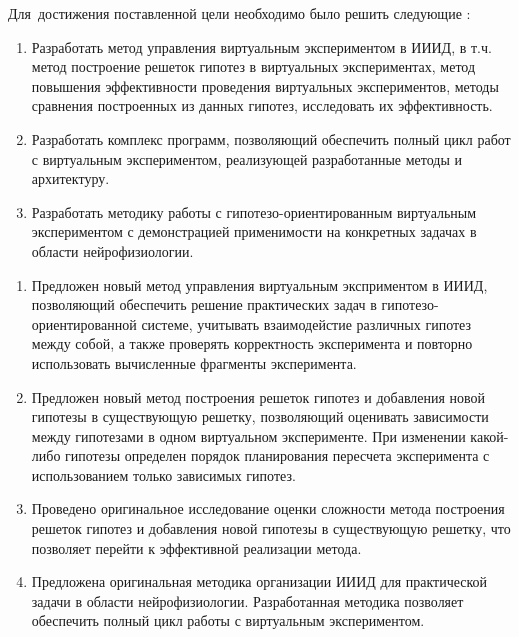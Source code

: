 Для~достижения поставленной цели необходимо было решить следующие {\tasks}:
\begin{enumerate}[beginpenalty=10000] %
    \item Разработать метод управления виртуальным экспериментом в ИИИД, в т.ч. метод построение решеток 
            гипотез в виртуальных экспериментах, метод повышения эффективности проведения виртуальных 
            экспериментов, методы сравнения построенных из данных гипотез, исследовать их эффективность.
    \item Разработать комплекс программ, позволяющий обеспечить полный цикл работ с виртуальным экспериментом, 
            реализующей разработанные методы и архитектуру.
    \item Разработать методику работы с гипотезо-ориентированным виртуальным экспериментом с демонстрацией 
            применимости на конкретных задачах в области нейрофизиологии.
\end{enumerate}


{\novelty}
\begin{enumerate}[beginpenalty=10000] %
  \item Предложен новый метод управления виртуальным эксприментом в ИИИД, позволяющий 
        обеспечить решение практических задач в гипотезо-ориентированной системе, учитывать взаимодейстие различных 
        гипотез между собой, а также проверять корректность эксперимента и повторно использовать вычисленные фрагменты
        эксперимента. 
  \item Предложен новый метод построения решеток гипотез и добавления новой гипотезы в существующую решетку, 
        позволяющий оценивать зависимости между гипотезами в одном виртуальном эксперименте.	
        При изменении какой-либо гипотезы определен порядок планирования пересчета эксперимента с использованием 
        только зависимых гипотез. 
  \item Проведено оригинальное исследование оценки сложности метода построения решеток гипотез и 
        добавления новой гипотезы в существующую решетку, что позволяет перейти к эффективной реализации метода.
  \item Предложена оригинальная методика организации ИИИД для практической задачи в области нейрофизиологии. 
        Разработанная методика позволяет обеспечить полный цикл работы с виртуальным экспериментом.
\end{enumerate}

